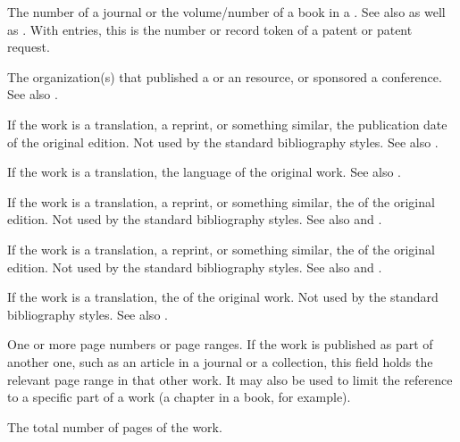 \documentclass{ltxdockit}[2011/03/25]
\begin{document}
\begin{fieldlist}

The number of a journal or the volume\slash number of a book in a . See also  as well as . With  entries, this is the number or record token of a patent or patent request.


The organization(s) that published a  or an  resource, or sponsored a conference. See also .


If the work is a translation, a reprint, or something similar, the publication date of the original edition. Not used by the standard bibliography styles. See also .


If the work is a translation, the language of the original work. See also .


If the work is a translation, a reprint, or something similar, the  of the original edition. Not used by the standard bibliography styles. See also  and .


If the work is a translation, a reprint, or something similar, the  of the original edition. Not used by the standard bibliography styles. See also  and .


If the work is a translation, the  of the original work. Not used by the standard bibliography styles. See also .


One or more page numbers or page ranges. If the work is published as part of another one, such as an article in a journal or a collection, this field holds the relevant page range in that other work. It may also be used to limit the reference to a specific part of a work (a chapter in a book, for example).


The total number of pages of the work.


\end{fieldlist}
\end{document}
